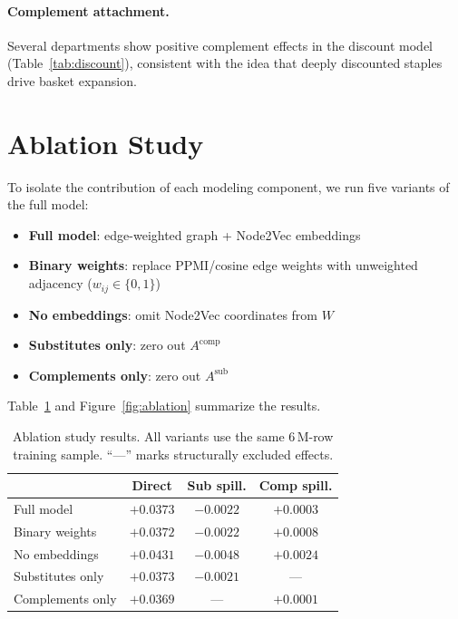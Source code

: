\documentclass[conference]{IEEEtran}
\begin{document}
\paragraph{Complement attachment.}
Several departments show positive complement effects in the discount
model (Table~\ref{tab:discount}), consistent with the idea that
deeply discounted staples drive basket expansion.


\section{Ablation Study}

To isolate the contribution of each modeling component, we run five
variants of the full model:

\begin{itemize}
    \item \textbf{Full model}: edge-weighted graph + Node2Vec embeddings
    \item \textbf{Binary weights}: replace PPMI/cosine edge weights with
          unweighted adjacency ($w_{ij} \in \{0,1\}$)
    \item \textbf{No embeddings}: omit Node2Vec coordinates from $W$
    \item \textbf{Substitutes only}: zero out $A^{\mathrm{comp}}$
    \item \textbf{Complements only}: zero out $A^{\mathrm{sub}}$
\end{itemize}

Table~\ref{tab:ablation} and Figure~\ref{fig:ablation} summarize the results.

\begin{table}[ht]
    \centering
    \caption{Ablation study results. All variants use the same 6\,M-row
        training sample. ``---'' marks structurally excluded effects.}
    \label{tab:ablation}
    \setlength{\tabcolsep}{4pt}
    \begin{tabular}{lccc}
        \toprule
                         & Direct    & Sub spill. & Comp spill. \\
        \midrule
        Full model       & $+0.0373$ & $-0.0022$  & $+0.0003$   \\
        Binary weights   & $+0.0372$ & $-0.0022$  & $+0.0008$   \\
        No embeddings    & $+0.0431$ & $-0.0048$  & $+0.0024$   \\
        Substitutes only & $+0.0373$ & $-0.0021$  & ---         \\
        Complements only & $+0.0369$ & ---        & $+0.0001$   \\
        \bottomrule
    \end{tabular}
\end{table}
\end{document}
